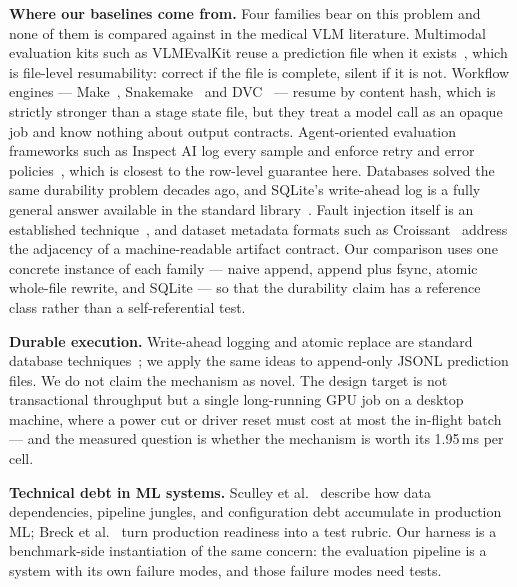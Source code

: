 \textbf{Where our baselines come from.} Four families bear on this problem and none of them is compared against in the medical VLM literature. Multimodal evaluation kits such as VLMEvalKit reuse a prediction file when it exists~\citep{duan2024vlmevalkit}, which is file-level resumability: correct if the file is complete, silent if it is not. Workflow engines --- Make~\citep{feldman1979make}, Snakemake~\citep{molder2021snakemake} and DVC~\citep{dvc2024} --- resume by content hash, which is strictly stronger than a stage state file, but they treat a model call as an opaque job and know nothing about output contracts. Agent-oriented evaluation frameworks such as Inspect AI log every sample and enforce retry and error policies~\citep{inspect2024}, which is closest to the row-level guarantee here. Databases solved the same durability problem decades ago, and SQLite's write-ahead log is a fully general answer available in the standard library~\citep{sqlitewal2024}. Fault injection itself is an established technique~\citep{hsueh1997fault}, and dataset metadata formats such as Croissant~\citep{akhtar2024croissant} address the adjacency of a machine-readable artifact contract. Our comparison uses one concrete instance of each family --- naive append, append plus fsync, atomic whole-file rewrite, and SQLite --- so that the durability claim has a reference class rather than a self-referential test.

\textbf{Durable execution.} Write-ahead logging and atomic replace are standard database techniques~\citep{mohan1992aries}; we apply the same ideas to append-only JSONL prediction files. We do not claim the mechanism as novel. The design target is not transactional throughput but a single long-running GPU job on a desktop machine, where a power cut or driver reset must cost at most the in-flight batch --- and the measured question is whether the mechanism is worth its 1.95\,ms per cell.

\textbf{Technical debt in ML systems.} Sculley et al.~\citep{sculley2015hidden} describe how data dependencies, pipeline jungles, and configuration debt accumulate in production ML; Breck et al.~\citep{breck2017mltest} turn production readiness into a test rubric. Our harness is a benchmark-side instantiation of the same concern: the evaluation pipeline is a system with its own failure modes, and those failure modes need tests.
